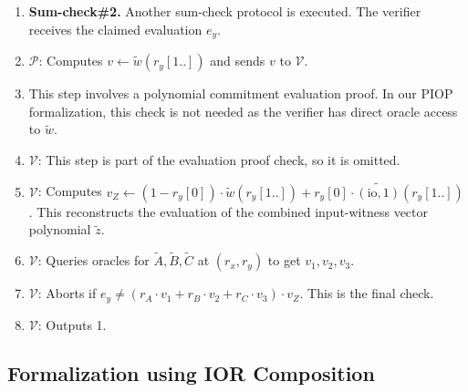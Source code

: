 \begin{description}
\begin{enumerate}
        \item \textbf{Sum-check\#2.} Another sum-check protocol is executed. The verifier receives the claimed evaluation $e_y$.
        \item $\mathcal{P}$: Computes $v \leftarrow \tilde{w}(r_y[1..])$ and sends $v$ to $\mathcal{V}$.
        \item This step involves a polynomial commitment evaluation proof. In our PIOP formalization, this check is not needed as the verifier has direct oracle access to $\tilde{w}$.
        \item $\mathcal{V}$: This step is part of the evaluation proof check, so it is omitted.
        \item $\mathcal{V}$: Computes $v_Z \leftarrow (1 - r_y[0]) \cdot \tilde{w}(r_y[1..]) + r_y[0] \cdot \widetilde{(\text{io}, 1)}(r_y[1..])$. This reconstructs the evaluation of the combined input-witness vector polynomial $\tilde{z}$.
        \item $\mathcal{V}$: Queries oracles for $\tilde{A}, \tilde{B}, \tilde{C}$ at $(r_x, r_y)$ to get $v_1, v_2, v_3$.
        \item $\mathcal{V}$: Aborts if $e_y \neq (r_A \cdot v_1 + r_B \cdot v_2 + r_C \cdot v_3) \cdot v_Z$. This is the final check.
        \item $\mathcal{V}$: Outputs 1.
    \end{enumerate}
\end{description}

\subsection{Formalization using IOR Composition}
